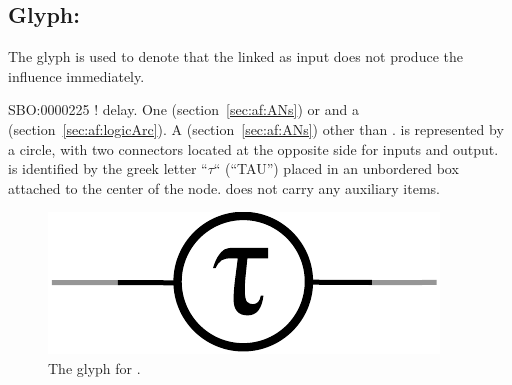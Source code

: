 
\subsection{Glyph: }\label{sec:delay}

The glyph  is used to denote that the  linked as input does not produce the influence immediately.

\begin{glyphDescription}
 \glyphSboTerm SBO:0000225 ! delay.
 \glyphOrigin One  (section~\ref{sec:af:ANs}) or and a  (section~\ref{sec:af:logicArc}).
 \glyphTarget A  (section~\ref{sec:af:ANs}) other than .
 \glyphContainer {} is represented by a circle, with two connectors located at the opposite side for inputs and output.
 \glyphLabel {} is identified by the greek letter ``$\tau$`` (``TAU'') placed in an unbordered box attached to the center of the node.
 \glyphAux {} does not carry any auxiliary items.
\end{glyphDescription}

\begin{figure}[H]
  \centering
  \includegraphics[scale = 0.5]{images/delay}
  \caption{The \AF glyph for .}
  \label{fig:delay}
\end{figure}
\normalcolor
